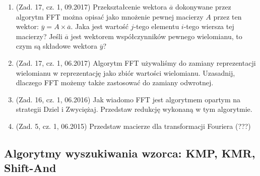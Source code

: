 \documentclass[10pt]{article}%
\begin{document}
\begin{enumerate}

\item (Zad. 17, cz. 1, 09.2017) Przekształcenie wektora $\overline{a}$ dokonywane przez algorytm FFT można opisać jako mnożenie pewnej macierzy $A$ przez ten wektor: $\overline{y} = A \times \overline{a}$. Jaka jest wartość $j$-tego elementu $i$-tego wiersza tej macierzy? Jeśli $\overline{a}$ jest wektorem współczynników pewnego wielomianu, to czym są składowe wektora $\overline{y}$?

\item (Zad. 17, cz. 1, 06.2017) Algorytm FFT używaliśmy do zamiany reprezentacji wielomianu w reprezentację jako zbiór wartości wielomianu. Uzasadnij, dlaczego FFT możemy także zastosować do zamiany odwrotnej.

\item (Zad. 16, cz. 1, 06.2016) Jak wiadomo FFT jest algorytmem opartym na strategii Dziel i Zwyciężaj. Przedstaw redukcję wykonaną w tym algorytmie.

\item (Zad. 5, cz. 1, 06.2015) Przedstaw macierze dla transformacji Fouriera (???)

\end{enumerate}


\subsection{Algorytmy wyszukiwania wzorca: KMP, KMR, Shift-And}
\end{document}
